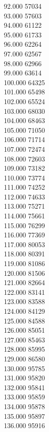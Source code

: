 { 92.000	57034 \\
 93.000	57603 \\
 94.000	61122 \\
 95.000	61733 \\
 96.000	62264 \\
 97.000	62567 \\
 98.000	62966 \\
 99.000	63614 \\
 100.000	64325 \\
 101.000	65498 \\
 102.000	65524 \\
 103.000	68030 \\
 104.000	68463 \\
 105.000	71050 \\
 106.000	71714 \\
 107.000	72474 \\
 108.000	72603 \\
 109.000	73182 \\
 110.000	73774 \\
 111.000	74252 \\
 112.000	74633 \\
 113.000	75271 \\
 114.000	75661 \\
 115.000	76299 \\
 116.000	77369 \\
 117.000	80053 \\
 118.000	80391 \\
 119.000	81086 \\
 120.000	81506 \\
 121.000	82664 \\
 122.000	83141 \\
 123.000	83588 \\
 124.000	84129 \\
 125.000	84588 \\
 126.000	85051 \\
 127.000	85463 \\
 128.000	85995 \\
 129.000	86580 \\
 130.000	95785 \\
 131.000	95820 \\
 132.000	95841 \\
 133.000	95859 \\
 134.000	95878 \\
 135.000	95897 \\
 136.000	95916 \\
}
